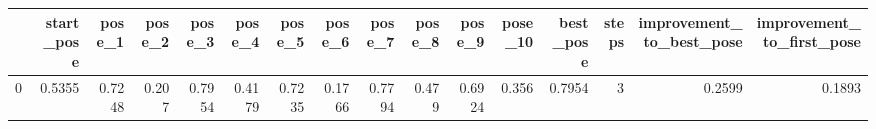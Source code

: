 \begin{tabular}{lrrrrrrrrrrrrrrr}
\toprule
{} &  start\_pose &  pose\_1 &  pose\_2 &  pose\_3 &  pose\_4 &  pose\_5 &  pose\_6 &  pose\_7 &  pose\_8 &  pose\_9 &  pose\_10 &  best\_pose &  steps &  improvement\_to\_best\_pose &  improvement\_to\_first\_pose \\
\midrule
0 &      0.5355 &  0.7248 &   0.207 &  0.7954 &  0.4179 &  0.7235 &  0.1766 &  0.7794 &   0.479 &  0.6924 &    0.356 &     0.7954 &      3 &                    0.2599 &                     0.1893 \\
\bottomrule
\end{tabular}
